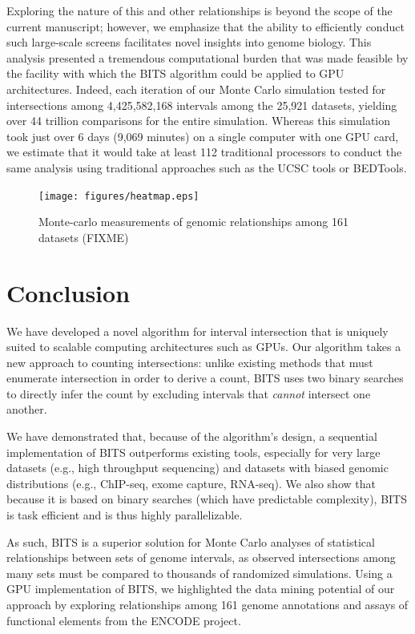 \documentclass{bioinfo}
\begin{document}
Exploring the nature of this and other relationships is beyond the 
scope of the current manuscript; however, we emphasize that the ability 
to efficiently conduct such large-scale screens facilitates novel 
insights into genome biology. This analysis presented a tremendous
computational burden that was made feasible by the facility with which
the BITS algorithm could be applied to GPU architectures. Indeed, each
iteration of our Monte Carlo simulation tested for
intersections among 4,425,582,168 intervals among the 25,921 datasets,
yielding over 44 trillion comparisons for the entire simulation. Whereas
this simulation took just over 6 days (9,069 minutes) on a single
computer with one GPU card, we estimate that it would take at least 
112 traditional processors to conduct the same analysis using 
traditional approaches such as the UCSC tools or BEDTools.

\begin{figure}[t]
        \texttt{[image: figures/heatmap.eps]}
        \caption[]{Monte-carlo measurements of genomic relationships 
among 161 datasets (FIXME)}
\end{figure}




\section{Conclusion}
We have developed a novel algorithm for interval intersection that
is uniquely suited to scalable computing architectures such as GPUs.
Our algorithm takes a new approach to counting intersections: 
unlike existing methods that must enumerate intersection in order to 
derive a count, BITS uses two binary searches to directly infer the 
count by excluding intervals that \emph{cannot} intersect one another. 

We have demonstrated that, because of the algorithm's design,
a sequential implementation of BITS outperforms existing tools, 
especially for very large datasets (e.g., high throughput sequencing) 
and datasets with biased 
genomic distributions (e.g., ChIP-seq, exome capture, RNA-seq). We also 
show that because it is based on binary searches (which have predictable 
complexity), BITS is task efficient and is thus highly parallelizable.

As such, BITS is a superior solution for Monte 
Carlo analyses of statistical relationships between sets of genome
intervals, as observed intersections among many sets must be compared to
thousands of randomized simulations. Using a GPU implementation of BITS,
we highlighted the data mining potential of our approach by 
exploring relationships among 161 genome annotations and assays of 
functional elements from the ENCODE project.
\end{document}
